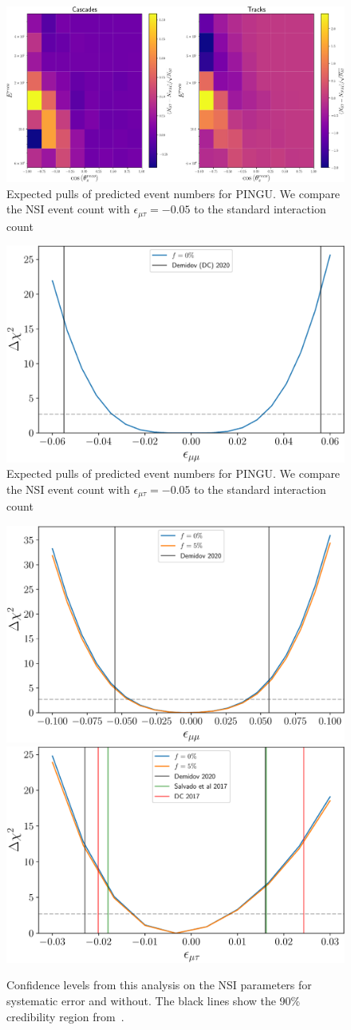 \documentclass[draft=True]{revtex4-2}
\newcommand{\emt}{\ensuremath{\epsilon_{\mu\tau}}}
\begin{document}
 \begin{figure}[!tb]
    \begin{center}
       \includegraphics[width=0.7\linewidth]{figures/PINGU_event_pulls.pdf}
    \end{center}
    \caption{Expected pulls of predicted event numbers for PINGU. We compare the NSI event count with $\emt=-0.05$
    to the standard interaction count}\label{fig:PINGU_event_pulls}
 \end{figure}

 \begin{figure}[!tb]
    \begin{center}
       \includegraphics[width=0.4\linewidth]{figures/PINGU_emm.pdf}
    \end{center}
    \caption{Expected pulls of predicted event numbers for PINGU. We compare the NSI event count with $\emt=-0.05$
    to the standard interaction count}\label{fig:PINGU_chisq}
 \end{figure}

 \begin{figure}[!tb]
    \begin{center}
       \includegraphics[width=0.4\linewidth]{figures/DC_emm.pdf}
       \includegraphics[width=0.4\linewidth]{figures/DC_emt.pdf}
    \end{center}
    \caption{Confidence levels from this analysis on the NSI
    parameters for systematic error and without. The black lines show the 90\% credibility region from~\cite{demidov}.}\label{fig:DC_chisq}
 \end{figure}



\end{document}
